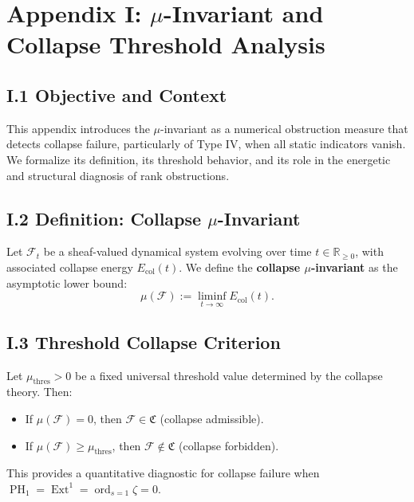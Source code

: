 \documentclass[11pt]{article}
\DeclareMathOperator{\Ext}{Ext}
\DeclareMathOperator{\PH}{PH}
\newcommand{\ord}{\operatorname{ord}}
\begin{document}
\appendix
\section*{Appendix I: \(\mu\)-Invariant and Collapse Threshold Analysis}

\subsection*{I.1 Objective and Context}

This appendix introduces the \(\mu\)-invariant as a numerical obstruction measure that detects collapse failure, particularly of Type IV, when all static indicators vanish. We formalize its definition, its threshold behavior, and its role in the energetic and structural diagnosis of rank obstructions.

\subsection*{I.2 Definition: Collapse \(\mu\)-Invariant}

Let \( \mathcal{F}_t \) be a sheaf-valued dynamical system evolving over time \( t \in \mathbb{R}_{\geq 0} \), with associated collapse energy \( E_{\mathrm{col}}(t) \). We define the \textbf{collapse \(\mu\)-invariant} as the asymptotic lower bound:
\[
\mu(\mathcal{F}) := \liminf_{t \to \infty} E_{\mathrm{col}}(t).
\]

\subsection*{I.3 Threshold Collapse Criterion}

Let \( \mu_{\mathrm{thres}} > 0 \) be a fixed universal threshold value determined by the collapse theory. Then:

\begin{itemize}
  \item If \( \mu(\mathcal{F}) = 0 \), then \( \mathcal{F} \in \mathfrak{C} \) (collapse admissible).
  \item If \( \mu(\mathcal{F}) \geq \mu_{\mathrm{thres}} \), then \( \mathcal{F} \notin \mathfrak{C} \) (collapse forbidden).
\end{itemize}

This provides a quantitative diagnostic for collapse failure when \(\PH_1 = \Ext^1 = \ord_{s=1} \zeta = 0\).
\end{document}
